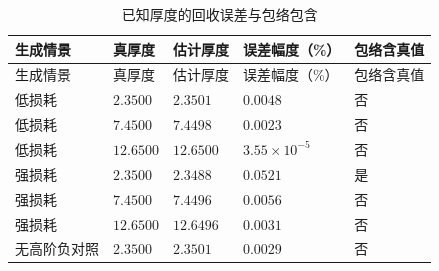 \begingroup
\small
\setlength{\LTpre}{0pt}
\setlength{\LTpost}{0pt}
\begin{longtable}{>{\centering\arraybackslash}p{}>{\centering\arraybackslash}p{}>{\centering\arraybackslash}p{}>{\centering\arraybackslash}p{}>{\centering\arraybackslash}p{}}
\caption{已知厚度的回收误差与包络包含}\label{tab:q3-known-thickness}\\
\toprule
生成情景 & 真厚度 & 估计厚度 & 误差幅度（\%） & 包络含真值\\
\midrule
\endfirsthead
\toprule
生成情景 & 真厚度 & 估计厚度 & 误差幅度（\%） & 包络含真值\\
\midrule
\endhead
低损耗 & $2.3500$ & $2.3501$ & $0.0048$ & 否\\
低损耗 & $7.4500$ & $7.4498$ & $0.0023$ & 否\\
低损耗 & $12.6500$ & $12.6500$ & $3.55\times10^{-5}$ & 否\\
强损耗 & $2.3500$ & $2.3488$ & $0.0521$ & 是\\
强损耗 & $7.4500$ & $7.4496$ & $0.0056$ & 否\\
强损耗 & $12.6500$ & $12.6496$ & $0.0031$ & 否\\
无高阶负对照 & $2.3500$ & $2.3501$ & $0.0029$ & 否\\

\end{longtable}
